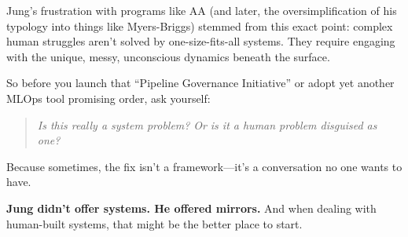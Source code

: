 Jung’s frustration with programs like AA (and later, the oversimplification of his typology into things like Myers-Briggs) stemmed from this exact point: complex human struggles aren’t solved by one-size-fits-all systems. They require engaging with the unique, messy, unconscious dynamics beneath the surface.

So before you launch that ``Pipeline Governance Initiative'' or adopt yet another MLOps tool promising order, ask yourself:

\begin{quote}
\textit{Is this really a system problem?} \textit{Or is it a human problem disguised as one?}
\end{quote}

Because sometimes, the fix isn’t a framework—it’s a conversation no one wants to have.

\textbf{Jung didn’t offer systems. He offered mirrors.} And when dealing with human-built systems, that might be the better place to start.

